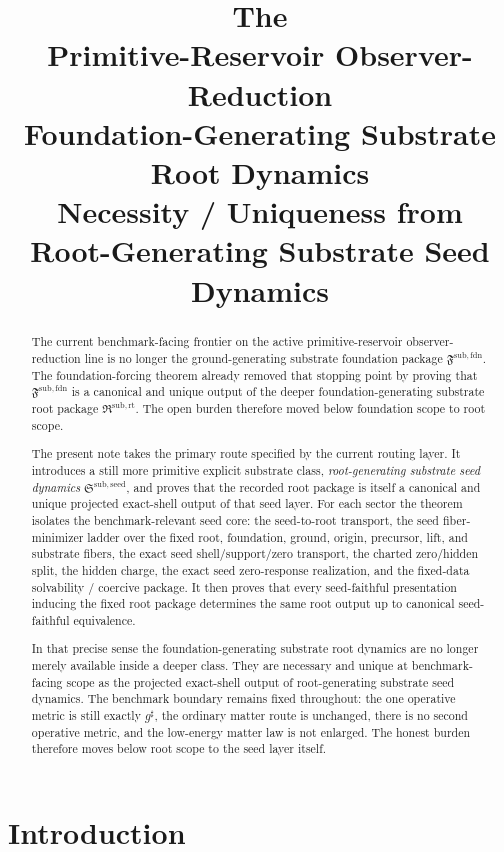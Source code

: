 \documentclass[11pt]{article}
\title{\textbf{The \TheoryName{}}\\[0.4em]
\large Primitive-Reservoir Observer-Reduction\\
\large Foundation-Generating Substrate Root Dynamics\\
\large Necessity / Uniqueness from\\
\large Root-Generating Substrate Seed Dynamics}
\author{}
\date{}
\newcommand{\CompletedMetric}{g^{\sharp}}
\newcommand{\FoundationPackage}{\mathfrak F^{\mathrm{sub,fdn}}}
\newcommand{\RootPackage}{\mathfrak R^{\mathrm{sub,rt}}}
\newcommand{\SeedPackage}{\mathfrak S^{\mathrm{sub,seed}}}
\begin{document}
\maketitle

\begin{abstract}
The current benchmark-facing frontier on the active primitive-reservoir observer-reduction line is no longer the ground-generating substrate foundation package \(\FoundationPackage\). The foundation-forcing theorem already removed that stopping point by proving that \(\FoundationPackage\) is a canonical and unique output of the deeper foundation-generating substrate root package \(\RootPackage\). The open burden therefore moved below foundation scope to root scope.

The present note takes the primary route specified by the current routing layer. It introduces a still more primitive explicit substrate class, \emph{root-generating substrate seed dynamics} \(\SeedPackage\), and proves that the recorded root package is itself a canonical and unique projected exact-shell output of that seed layer. For each sector the theorem isolates the benchmark-relevant seed core: the seed-to-root transport, the seed fiber-minimizer ladder over the fixed root, foundation, ground, origin, precursor, lift, and substrate fibers, the exact seed shell/support/zero transport, the charted zero/hidden split, the hidden charge, the exact seed zero-response realization, and the fixed-data solvability / coercive package. It then proves that every seed-faithful presentation inducing the fixed root package determines the same root output up to canonical seed-faithful equivalence.

In that precise sense the foundation-generating substrate root dynamics are no longer merely available inside a deeper class. They are necessary and unique at benchmark-facing scope as the projected exact-shell output of root-generating substrate seed dynamics. The benchmark boundary remains fixed throughout: the one operative metric is still exactly \(\CompletedMetric\), the ordinary matter route is unchanged, there is no second operative metric, and the low-energy matter law is not enlarged. The honest burden therefore moves below root scope to the seed layer itself.
\end{abstract}

\section{Introduction}
\end{document}

